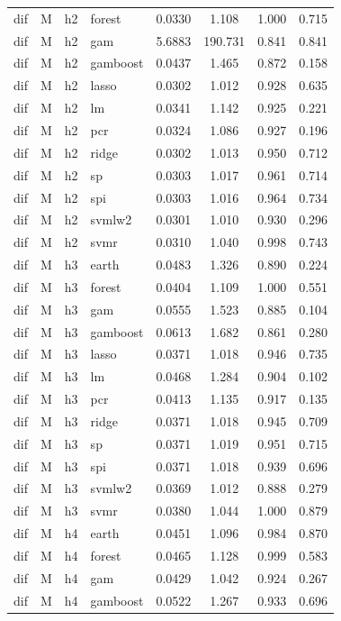 \begin{ThreePartTable}
\begin{longtable}[t]{llclcccc}
dif & M & h2 & forest & 0.0330 & 1.108 & 1.000 & 0.715\\
dif & M & h2 & gam & 5.6883 & 190.731 & 0.841 & 0.841\\
dif & M & h2 & gamboost & 0.0437 & 1.465 & 0.872 & 0.158\\
dif & M & h2 & lasso & 0.0302 & 1.012 & 0.928 & 0.635\\
dif & M & h2 & lm & 0.0341 & 1.142 & 0.925 & 0.221\\
dif & M & h2 & pcr & 0.0324 & 1.086 & 0.927 & 0.196\\
dif & M & h2 & ridge & 0.0302 & 1.013 & 0.950 & 0.712\\
dif & M & h2 & sp & 0.0303 & 1.017 & 0.961 & 0.714\\
dif & M & h2 & spi & 0.0303 & 1.016 & 0.964 & 0.734\\
dif & M & h2 & svmlw2 & 0.0301 & 1.010 & 0.930 & 0.296\\
dif & M & h2 & svmr & 0.0310 & 1.040 & 0.998 & 0.743\\
\addlinespace
dif & M & h3 & earth & 0.0483 & 1.326 & 0.890 & 0.224\\
dif & M & h3 & forest & 0.0404 & 1.109 & 1.000 & 0.551\\
dif & M & h3 & gam & 0.0555 & 1.523 & 0.885 & 0.104\\
dif & M & h3 & gamboost & 0.0613 & 1.682 & 0.861 & 0.280\\
dif & M & h3 & lasso & 0.0371 & 1.018 & 0.946 & 0.735\\
dif & M & h3 & lm & 0.0468 & 1.284 & 0.904 & 0.102\\
dif & M & h3 & pcr & 0.0413 & 1.135 & 0.917 & 0.135\\
dif & M & h3 & ridge & 0.0371 & 1.018 & 0.945 & 0.709\\
dif & M & h3 & sp & 0.0371 & 1.019 & 0.951 & 0.715\\
dif & M & h3 & spi & 0.0371 & 1.018 & 0.939 & 0.696\\
dif & M & h3 & svmlw2 & 0.0369 & 1.012 & 0.888 & 0.279\\
dif & M & h3 & svmr & 0.0380 & 1.044 & 1.000 & 0.879\\
\addlinespace
dif & M & h4 & earth & 0.0451 & 1.096 & 0.984 & 0.870\\
dif & M & h4 & forest & 0.0465 & 1.128 & 0.999 & 0.583\\
dif & M & h4 & gam & 0.0429 & 1.042 & 0.924 & 0.267\\
dif & M & h4 & gamboost & 0.0522 & 1.267 & 0.933 & 0.696\\

\end{longtable}
\end{ThreePartTable}

